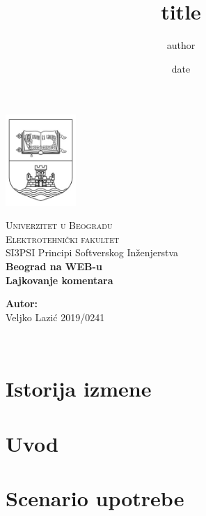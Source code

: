 \documentclass[12pt]{report}
\begin{document}
\title{title}
\author{author}
\date{date}

\begin{titlepage}
\begin{center}
    \includegraphics[width=0.2\textwidth]{logo.jpg}
\end{center}
\begin{center}
    \textsc{ \LARGE{Univerzitet u Beogradu \\}}
	\textsc{ \LARGE{Elektrotehnički fakultet\\ }}
	\textnormal{ \LARGE{SI3PSI Principi Softverskog Inženjerstva\\}}
	\vspace{30mm}
	\fontsize{10mm}{7mm}\selectfont 
    \textbf{\textup{Beograd na WEB-u}}\\
    \textbf{Lajkovanje komentara}\\
\end{center}

\vspace{25mm}

\begin{minipage}[t]{0.47\textwidth}
	\textnormal{\large{\bf Autor:\\}}
	{\large Veljko Lazić 2019/0241}\\
\end{minipage}

\vspace{20mm}

\\

\end{titlepage}


\chapter{\color{RoyalBlue}Istorija izmene}

\chapter{\color{RoyalBlue}Uvod}

\chapter{\color{RoyalBlue}Scenario upotrebe}

\end{document}
